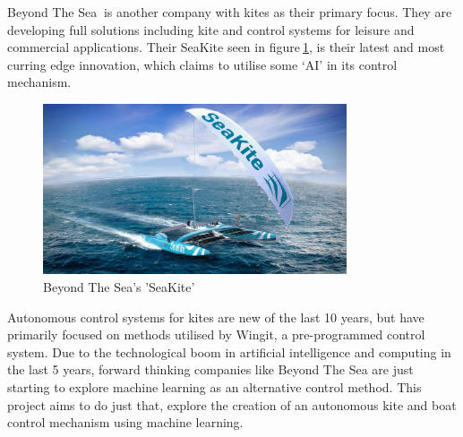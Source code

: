 Beyond The Sea$~$\cite{beyondthesea} is another company with kites as their primary focus. They are developing full solutions including kite and control systems for leisure and commercial applications. Their SeaKite seen in figure$~$\ref{seakite}, is their latest and most curring edge innovation, which claims to utilise some `AI' in its control mechanism. 

\begin{figure}
\centering
    \includegraphics[width=0.8\textwidth]{Images/seakite.jpg}
    \caption{Beyond The Sea's 'SeaKite'}\label{seakite}
\end{figure}

Autonomous control systems for kites are new of the last 10 years, but have primarily focused on methods utilised by Wingit, a pre-programmed control system. Due to the technological boom in artificial intelligence and computing in the last 5 years, forward thinking companies like Beyond The Sea are just starting to explore machine learning as an alternative control method. This project aims to do just that, explore the creation of an autonomous kite and boat control mechanism using machine learning. 